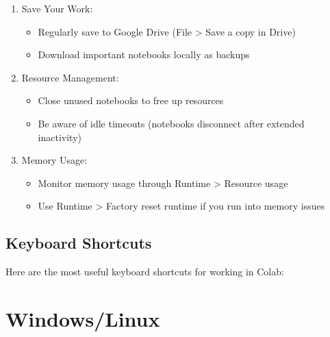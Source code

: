 \documentclass[
  letterpaper,
  DIV=11,
  numbers=noendperiod]{scrreprt}
\providecommand{\tightlist}{%
  \setlength{\itemsep}{0pt}\setlength{\parskip}{0pt}}\usepackage{longtable,booktabs,array}
\begin{document}
\begin{enumerate}
\def\labelenumi{\arabic{enumi}.}
\tightlist
\item
  Save Your Work:

  \begin{itemize}
  \tightlist
  \item
    Regularly save to Google Drive (File \textgreater{} Save a copy in
    Drive)
  \item
    Download important notebooks locally as backups
  \end{itemize}
\item
  Resource Management:

  \begin{itemize}
  \tightlist
  \item
    Close unused notebooks to free up resources
  \item
    Be aware of idle timeouts (notebooks disconnect after extended
    inactivity)
  \end{itemize}
\item
  Memory Usage:

  \begin{itemize}
  \tightlist
  \item
    Monitor memory usage through Runtime \textgreater{} Resource usage
  \item
    Use Runtime \textgreater{} Factory reset runtime if you run into
    memory issues
  \end{itemize}
\end{enumerate}

\hypertarget{keyboard-shortcuts}{%
\subsection{Keyboard Shortcuts}\label{keyboard-shortcuts}}

Here are the most useful keyboard shortcuts for working in Colab:

\section{Windows/Linux}
\end{document}
